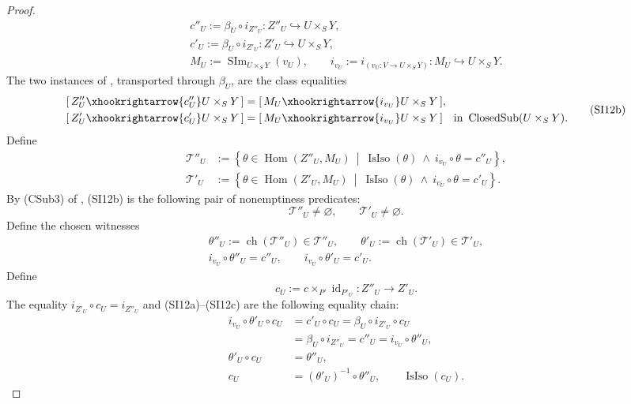 \begin{proof}
\[\begin{gathered}
    c''_U:=\beta_U\circ i_{Z''_U}\colon Z''_U\hookrightarrow U\times_SY,\\
    c'_U:=\beta_U\circ i_{Z'_U}\colon Z'_U\hookrightarrow U\times_SY,\\
    M_U:=\operatorname{SIm}_{U\times_SY}(v_U),\qquad
    i_{v_U}:=i_{(v_U\colon V\to U\times_SY)}\colon
      M_U\hookrightarrow U\times_SY.
  \end{gathered}                                                   \tag{SI12a}
  \]
  The two instances of
  , transported through
  $\beta_U$, are the class equalities
  \[
  \begin{aligned}
    [\,Z''_U\xhookrightarrow{c''_U}U\times_SY\,]
      &=[\,M_U\xhookrightarrow{i_{v_U}}U\times_SY\,],\\
    [\,Z'_U\xhookrightarrow{c'_U}U\times_SY\,]
      &=[\,M_U\xhookrightarrow{i_{v_U}}U\times_SY\,]
      \quad\text{in }\operatorname{ClosedSub}(U\times_SY).
  \end{aligned}                                                    \tag{SI12b}
  \]
  Define
  \[
  \begin{aligned}
    \mathscr T''_U
      &:=\left\{\theta\in\operatorname{Hom}(Z''_U,M_U)
        \ \middle|\
        \operatorname{IsIso}(\theta)\ \wedge\
        i_{v_U}\circ\theta=c''_U\right\},\\
    \mathscr T'_U
      &:=\left\{\theta\in\operatorname{Hom}(Z'_U,M_U)
        \ \middle|\
        \operatorname{IsIso}(\theta)\ \wedge\
        i_{v_U}\circ\theta=c'_U\right\}.
  \end{aligned}
  \]
  By (CSub3) of , (SI12b) is the
  following pair of nonemptiness predicates:
  \[
    \mathscr T''_U\ne\varnothing,
    \qquad
    \mathscr T'_U\ne\varnothing.
  \]
  Define the chosen witnesses
  \[
  \begin{gathered}
    \theta''_U:=\operatorname{ch}(\mathscr T''_U)\in\mathscr T''_U,
    \qquad
    \theta'_U:=\operatorname{ch}(\mathscr T'_U)\in\mathscr T'_U,\\
    i_{v_U}\circ\theta''_U=c''_U,
    \qquad
    i_{v_U}\circ\theta'_U=c'_U.
  \end{gathered}                                                    \tag{SI12c}
  \]
  Define
  \[
    c_U:=c\times_{P'}\operatorname{id}_{P'_U}
      \colon Z''_U\longrightarrow Z'_U.
  \]
  The equality $i_{Z'_U}\circ c_U=i_{Z''_U}$ and (SI12a)--(SI12c) are the
  following equality chain:
  \[
  \begin{aligned}
    i_{v_U}\circ\theta'_U\circ c_U
      &=c'_U\circ c_U
       =\beta_U\circ i_{Z'_U}\circ c_U\\
      &=\beta_U\circ i_{Z''_U}
       =c''_U
       =i_{v_U}\circ\theta''_U,\\
    \theta'_U\circ c_U&=\theta''_U,\\
    c_U&=(\theta'_U)^{-1}\circ\theta''_U,
    \qquad \operatorname{IsIso}(c_U).
  \end{aligned}                                                     \tag{SI12}
  \]


\end{proof}
